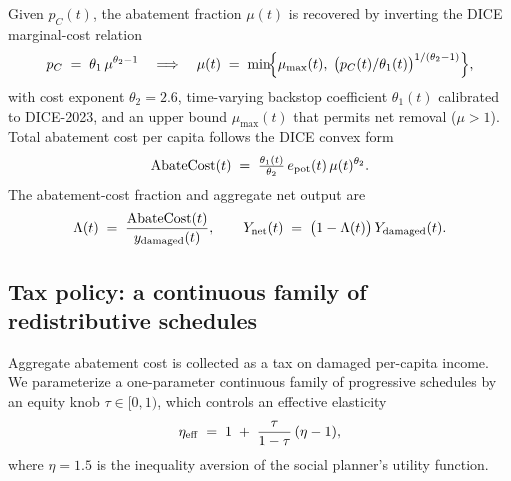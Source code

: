 Given $p_C(t)$, the abatement fraction $\mu(t)$ is recovered by inverting the DICE marginal-cost relation
\begin{equation}\label{eq:si_mac}
p_C \;=\; \theta_1\,\mu^{\theta_2-1}
\quad\Longrightarrow\quad
\mu(t) \;=\; \min\!\Bigl\{\mu_{\max}(t),\; \bigl(p_C(t)/\theta_1(t)\bigr)^{1/(\theta_2-1)}\Bigr\}, %
\end{equation}
with cost exponent $\theta_2 = 2.6$, time-varying backstop coefficient $\theta_1(t)$ calibrated to DICE-2023, and an upper bound $\mu_{\max}(t)$ that permits net removal ($\mu > 1$).  Total abatement cost per capita follows the DICE convex form
\begin{equation}\label{eq:si_abatecost}
\mathrm{AbateCost}(t) \;=\; \tfrac{\theta_1(t)}{\theta_2}\, e_{\rm pot}(t)\, \mu(t)^{\theta_2}. %
\end{equation}
The abatement-cost fraction and aggregate net output are
\begin{equation}\label{eq:si_ynet_agg}
\Lambda(t) \;=\; \frac{\mathrm{AbateCost}(t)}{y_{\rm damaged}(t)},
\qquad
Y_{\rm net}(t) \;=\; \bigl(1 - \Lambda(t)\bigr)\, Y_{\rm damaged}(t). %
\end{equation}

\subsection*{Tax policy: a continuous family of redistributive schedules}\label{si:taxpolicies}

Aggregate abatement cost is collected as a tax on damaged per-capita income.  We parameterize a one-parameter continuous family of progressive schedules by an equity knob $\tau \in [0,1)$, which controls an effective elasticity
\begin{equation}\label{eq:si_eta_eff}
\eta_{\rm eff} \;=\; 1 \;+\; \frac{\tau}{1-\tau}\,(\eta - 1), %
\end{equation}
where $\eta = 1.5$ is the inequality aversion of the social planner's utility function.

